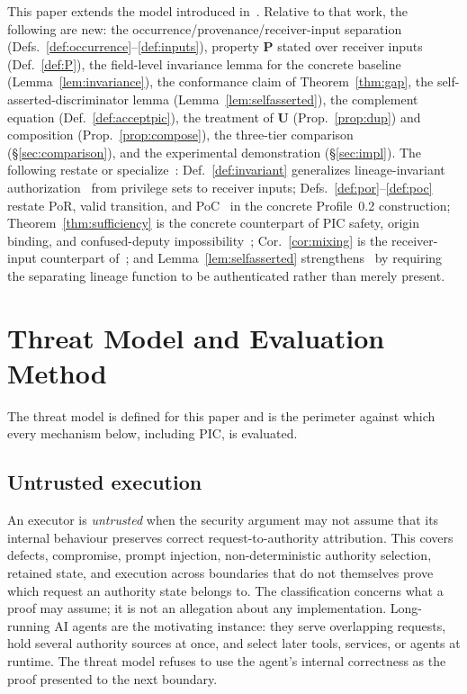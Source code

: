 \documentclass[conference]{IEEEtran}
\begin{document}
This paper extends the model introduced in~\cite{gallo2026poc}. Relative to that work, the following are new: the occurrence/provenance/receiver-input separation (Defs.~\ref{def:occurrence}--\ref{def:inputs}), property $\mathbf{P}$ stated over receiver inputs (Def.~\ref{def:P}), the field-level invariance lemma for the concrete baseline (Lemma~\ref{lem:invariance}), the conformance claim of Theorem~\ref{thm:gap}, the self-asserted-discriminator lemma (Lemma~\ref{lem:selfasserted}), the complement equation (Def.~\ref{def:acceptpic}), the treatment of $\mathbf{U}$ (Prop.~\ref{prop:dup}) and composition (Prop.~\ref{prop:compose}), the three-tier comparison (\S\ref{sec:comparison}), and the experimental demonstration (\S\ref{sec:impl}). The following restate or specialize~\cite{gallo2026poc}: Def.~\ref{def:invariant} generalizes lineage-invariant authorization~\cite[Defs.~7--8]{gallo2026poc} from privilege sets to receiver inputs; Defs.~\ref{def:por}--\ref{def:poc} restate PoR, valid transition, and PoC~\cite[Defs.~4--6]{gallo2026poc} in the concrete Profile~0.2 construction; Theorem~\ref{thm:sufficiency} is the concrete counterpart of PIC safety, origin binding, and confused-deputy impossibility~\cite[Thm.~1, Lem.~1, Thm.~6]{gallo2026poc}; Cor.~\ref{cor:mixing} is the receiver-input counterpart of~\cite[Thm.~6]{gallo2026poc}; and Lemma~\ref{lem:selfasserted} strengthens~\cite[Thm.~4]{gallo2026poc} by requiring the separating lineage function to be authenticated rather than merely present.

\section{Threat Model and Evaluation Method}\label{sec:threat}

The threat model is defined for this paper and is the perimeter against which every mechanism below, including PIC, is evaluated.

\subsection{Untrusted execution}
An executor is \emph{untrusted} when the security argument may not assume that its internal behaviour preserves correct request-to-authority attribution. This covers defects, compromise, prompt injection, non-deterministic authority selection, retained state, and execution across boundaries that do not themselves prove which request an authority state belongs to. The classification concerns what a proof may assume; it is not an allegation about any implementation. Long-running AI agents are the motivating instance: they serve overlapping requests, hold several authority sources at once, and select later tools, services, or agents at runtime. The threat model refuses to use the agent's internal correctness as the proof presented to the next boundary.
\end{document}
